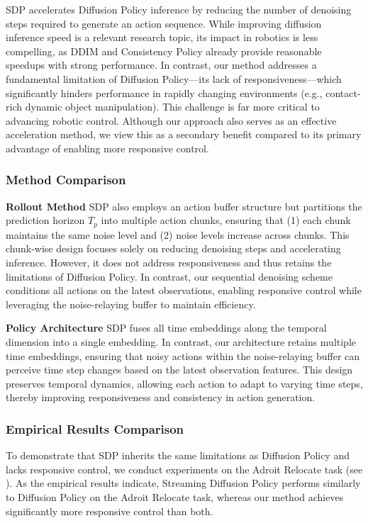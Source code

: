 SDP accelerates Diffusion Policy inference by reducing the number of denoising steps required to generate an action sequence. While improving diffusion inference speed is a relevant research topic, its impact in robotics is less compelling, as DDIM and Consistency Policy already provide reasonable speedups with strong performance. In contrast, our method addresses a fundamental limitation of Diffusion Policy—its lack of responsiveness—which significantly hinders performance in rapidly changing environments (e.g., contact-rich dynamic object manipulation). This challenge is far more critical to advancing robotic control. Although our approach also serves as an effective acceleration method, we view this as a secondary benefit compared to its primary advantage of enabling more responsive control.

\subsubsection{Method Comparison}
\label{sup:sdp_method}

\textbf{Rollout Method} SDP also employs an action buffer structure but partitions the prediction horizon $T_p$ into multiple action chunks, ensuring that (1) each chunk maintains the same noise level and (2) noise levels increase across chunks. This chunk-wise design focuses solely on reducing denoising steps and accelerating inference. However, it does not address responsiveness and thus retains the limitations of Diffusion Policy. In contrast, our sequential denoising scheme conditions all actions on the latest observations, enabling responsive control while leveraging the noise-relaying buffer to maintain efficiency.

\textbf{Policy Architecture}
SDP fuses all time embeddings along the temporal dimension into a single embedding. In contrast, our architecture retains multiple time embeddings, ensuring that noisy actions within the noise-relaying buffer can perceive time step changes based on the latest observation features. This design preserves temporal dynamics, allowing each action to adapt to varying time steps, thereby improving responsiveness and consistency in action generation.

\subsubsection{Empirical Results Comparison}
\label{sup:sdp_empirical}

To demonstrate that SDP inherits the same limitations as Diffusion Policy and lacks responsive control, we conduct experiments on the Adroit Relocate task (see ). As the empirical results indicate, Streaming Diffusion Policy performs similarly to Diffusion Policy on the Adroit Relocate task, whereas our method achieves significantly more responsive control than both.



